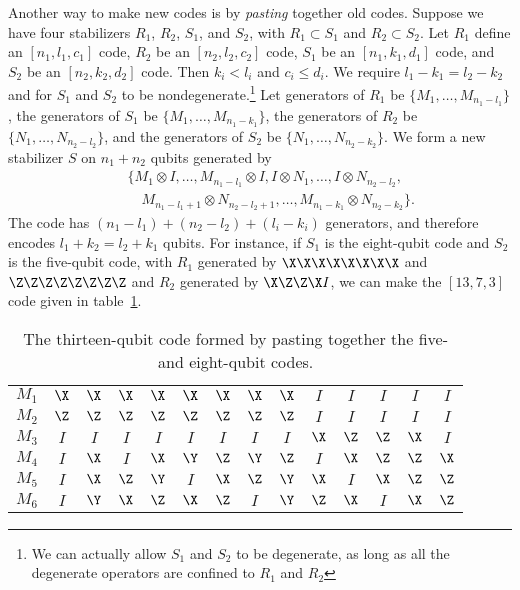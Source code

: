 Another way to make new codes is by {\em pasting} together old codes.  Suppose
we have four stabilizers $R_1$, $R_2$, $S_1$, and $S_2$, with $R_1 \subset
S_1$ and $R_2 \subset S_2$.  Let $R_1$ define an $[n_1, l_1, c_1]$ code,
$R_2$ be an $[n_2, l_2, c_2]$ code, $S_1$ be an $[n_1, k_1, d_1]$ code, and
$S_2$ be an $[n_2, k_2, d_2]$ code.  Then $k_i < l_i$ and $c_i \leq d_i$.  We
require $l_1-k_1 = l_2-k_2$ and for $S_1$ and $S_2$ to be
nondegenerate.\footnote{We can actually allow $S_1$ and $S_2$ to be degenerate,
	as long as all the degenerate operators are confined to $R_1$ and $R_2$}  Let
generators of $R_1$ be $\{M_1, \ldots, M_{n_1 - l_1}\}$, the generators of
$S_1$ be $\{M_1, \ldots, M_{n_1-k_1}\}$, the generators of $R_2$ be $\{N_1,
\ldots, N_{n_2-l_2}\}$, and the generators of $S_2$ be $\{N_1, \ldots,
N_{n_2-k_2}\}$.  We form a new stabilizer $S$ on $n_1 + n_2$ qubits generated
by
\begin{eqnarray}
	& & \{M_1 \otimes I, \ldots, M_{n_1-l_1} \otimes I, I \otimes N_1, \ldots,
	I \otimes N_{n_2-l_2}, \nonumber \\
	& & \quad M_{n_1-l_1+1} \otimes N_{n_2-l_2+1}, \ldots,
	M_{n_1-k_1} \otimes N_{n_2-k_2} \}.
\end{eqnarray}
The code has $(n_1-l_1) + (n_2-l_2) + (l_i-k_i)$ generators, and therefore
encodes $l_1+k_2 = l_2+k_1$ qubits.  For instance, if $S_1$ is the eight-qubit
code and $S_2$ is the five-qubit code, with $R_1$ generated by $\X \X \X \X
\X \X \X \X$ and $\Z \Z \Z \Z \Z \Z \Z \Z$ and $R_2$ generated by $\X \Z
\Z \X I$, we can make the $[13,7,3]$ code given in
table~\ref{table-13qubit}.
\begin{table}
	\centering
	\begin{tabular}{c|cccccccc|ccccc}
		$M_1$ & $\X$ & $\X$ & $\X$ & $\X$ & $\X$ & $\X$ & $\X$ & $\X$ & $I$
		& $I$ & $I$ & $I$ & $I$ \\
		$M_2$ & $\Z$ & $\Z$ & $\Z$ & $\Z$ & $\Z$ & $\Z$ & $\Z$ & $\Z$ & $I$ &
		$I$ & $I$ & $I$ & $I$ \\
		\hline
		$M_3$ & $I$ & $I$ & $I$ & $I$ & $I$ & $I$ & $I$ & $I$ & $\X$ & $\Z$ &
		$\Z$ & $\X$ & $I$ \\
		\hline
		$M_4$ & $I$ & $\X$ & $I$ & $\X$ & $\Y$ & $\Z$ & $\Y$ & $\Z$ & $I$ &
		$\X$ & $\Z$ & $\Z$ & $\X$ \\
		$M_5$ & $I$ & $\X$ & $\Z$ & $\Y$ & $I$ & $\X$ & $\Z$ & $\Y$ & $\X$ &
		$I$ & $\X$ & $\Z$ & $\Z$ \\
		$M_6$ & $I$ & $\Y$ & $\X$ & $\Z$ & $\X$ & $\Z$ & $I$ & $\Y$ & $\Z$ &
		$\X$ & $I$ & $\X$ & $\Z$
	\end{tabular}
	\caption{The thirteen-qubit code formed by pasting together the five- and
	eight-qubit codes.}
	\label{table-13qubit}
\end{table}


